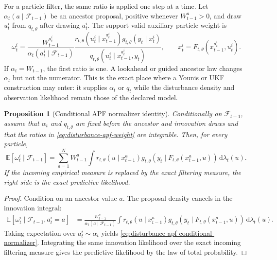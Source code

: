 \documentclass[11pt]{article}
\newtheorem{proposition}{Proposition}
\newcommand{\dd}{\mathrm{d}}
\begin{document}
For a particle filter, the same ratio is applied one step at a time. Let
$\alpha_t(a\mid\mathcal F_{t-1})$ be an ancestor proposal, positive whenever
$W_{t-1}^a>0$, and draw $u_t^i$ from $q_{t,\theta}$ after drawing
$a_t^i$. The support-valid auxiliary particle weight is
\begin{equation}
 \omega_t^i=
 \frac{W_{t-1}^{a_t^i}}{\alpha_t(a_t^i\mid\mathcal F_{t-1})}
 \frac{r_{t,\theta}(u_t^i\mid x_{t-1}^{a_t^i})
       g_{t,\theta}(y_t\mid x_t^i)}
      {q_{t,\theta}(u_t^i\mid x_{t-1}^{a_t^i},y_t)},
 \qquad x_t^i=F_{t,\theta}(x_{t-1}^{a_t^i},u_t^i).
 \label{eq:disturbance-apf-weight}
\end{equation}
If $\alpha_t=W_{t-1}$, the first ratio is one. A lookahead or guided
ancestor law changes $\alpha_t$ but not the numerator. This is the exact
place where a Younis or UKF construction may enter: it supplies
$\alpha_t$ or $q_t$ while the disturbance density and observation likelihood
remain those of the declared model.

\begin{proposition}[Conditional APF normalizer identity]
\label{prop:disturbance-apf-normalizer}
Conditionally on $\mathcal F_{t-1}$, assume that $\alpha_t$ and $q_{t,\theta}$
are fixed before the ancestor and innovation draws and that the ratios in
\eqref{eq:disturbance-apf-weight} are integrable. Then, for every particle,
\begin{equation}
 \mathbb E[\omega_t^i\mid\mathcal F_{t-1}]
 =\sum_{a=1}^N W_{t-1}^a
   \int r_{t,\theta}(u\mid x_{t-1}^a)
        g_{t,\theta}(y_t\mid F_{t,\theta}(x_{t-1}^a,u))\,\dd\lambda_t(u).
 \label{eq:disturbance-apf-conditional-normalizer}
\end{equation}
If the incoming empirical measure is replaced by the exact filtering measure,
the right side is the exact predictive likelihood.
\end{proposition}

\begin{proof}
Condition on an ancestor value $a$. The proposal density cancels in the
innovation integral:
\begin{align*}
 \mathbb E[\omega_t^i\mid\mathcal F_{t-1},a_t^i=a]
 &=\frac{W_{t-1}^a}{\alpha_t(a\mid\mathcal F_{t-1})}
   \int r_{t,\theta}(u\mid x_{t-1}^a)
        g_{t,\theta}(y_t\mid F_{t,\theta}(x_{t-1}^a,u))\,\dd\lambda_t(u).
\end{align*}
Taking expectation over $a_t^i\sim\alpha_t$ yields
\eqref{eq:disturbance-apf-conditional-normalizer}. Integrating the same
innovation likelihood over the exact incoming filtering measure gives the
predictive likelihood by the law of total probability.
\end{proof}
\end{document}
